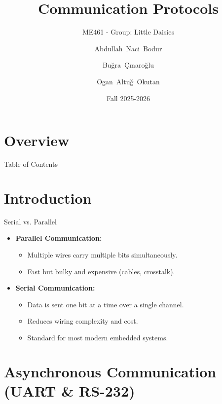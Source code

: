 

\title{Communication Protocols}
\subtitle{ME461 - Group: Little Daisies}
\author[Little Daisies]{Abdullah~Naci~Bodur\and
        Buğra~Çınaroğlu\and
        Ogan~Altuğ~Okutan
}
\date[ME461 Fall 25-26]{Fall 2025-2026}




\frame{\titlepage}

\section{Overview}

\begin{frame}{Table of Contents}
\tableofcontents
\end{frame}

\section{Introduction}

\begin{frame}{Serial vs. Parallel}
\begin{itemize}
    \item \textbf{Parallel Communication:}
    \begin{itemize}
        \item Multiple wires carry multiple bits simultaneously.
        \item Fast but bulky and expensive (cables, crosstalk).
    \end{itemize}
    \item \textbf{Serial Communication:}
    \begin{itemize}
        \item Data is sent one bit at a time over a single channel.
        \item Reduces wiring complexity and cost.
        \item Standard for most modern embedded systems.
    \end{itemize}
\end{itemize}
\end{frame}

\section{Asynchronous Communication (UART & RS-232)}

